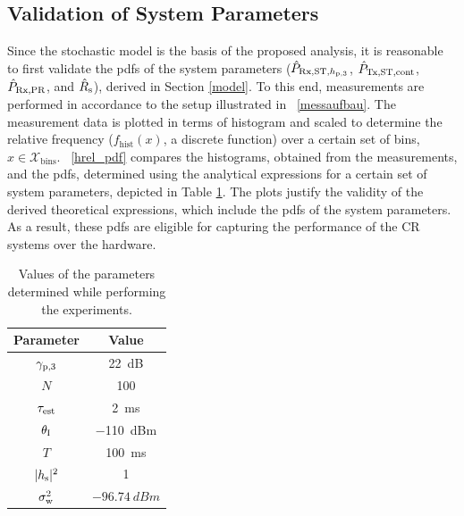 \subsection{Validation of System Parameters}
\label{ssec:val_sys}
Since the stochastic model is the basis of the proposed analysis, it is reasonable to first validate the pdfs of the system parameters ($\hat{P}_{\text{Rx,ST,$h_{\text{p,3}}$}}$, $\hat{P}_{\text{Tx,ST,cont}}$, $\hat{P}_{\text{Rx,PR}}$, and $\hat{{{R}}}_{\text{s}}$), derived in Section \ref{model}. To this end, measurements are performed in accordance to the setup illustrated in \figurename~\ref{messaufbau}. The measurement data is plotted in terms of histogram and scaled to determine the relative frequency ($f_\textrm{hist}(x)$, a discrete function) over a certain set of bins, $x \in \mathcal X_\text{bins}$. \figurename~\ref{hrel_pdf} compares the histograms, obtained from the measurements, and the pdfs, determined using the analytical expressions for a certain set of system parameters, depicted in Table \ref{param}. The plots justify the validity of the derived theoretical expressions, which include the pdfs of the system parameters. As a result, these pdfs are eligible for capturing the performance of the CR systems over the hardware. 


\begin{table}
	\renewcommand{\arraystretch}{1.4}
	\centering
	\caption{Values of the parameters determined while performing the experiments.}
	\label{param}
	\begin{tabular}{c||c}
		\bfseries Parameter & \bfseries Value \\ \hline \hline
		${\gamma}_{\text{p,3}}$ & \SI{22}{dB} \\
		$N$ & 100 \\
		$\tau_{\text{est}}$ & \SI{2}{ms}\\
		$\theta_{\text{I}}$ & \SI{-110}{dBm}\\
		$T$ & \SI{100}{ms}\\
		$|h_{\text{s}}|^2$ & 1 \\
		$\sigma^2_{\text{w}}$ & $\SI{-96.74}{dBm}$\\ \hline
	\end{tabular}
\end{table}

